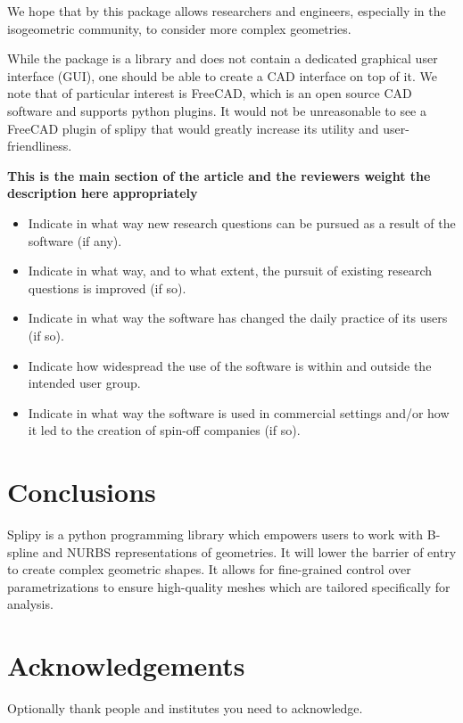 \documentclass[preprint,12pt, a4paper]{elsarticle}
\begin{document}
We hope that by this package allows researchers and engineers, especially in the isogeometric community, to consider more complex geometries.

While the package is a library and does not contain a dedicated graphical user interface (GUI), one should be able to create a CAD interface on top of it.
We note that of particular interest is FreeCAD, which is an open source CAD software and supports python plugins.
It would not be unreasonable to see a FreeCAD plugin of splipy that would greatly increase its utility and user-friendliness.

\textbf{This is the main section of the article and the reviewers weight the description here appropriately}
\begin{itemize}
  \item Indicate in what way new research questions can be pursued as a result of the software (if any).
  \item Indicate in what way, and to what extent, the pursuit of existing research questions is improved (if so).
  \item Indicate in what way the software has changed the daily practice of its users (if so).
  \item Indicate how widespread the use of the software is within and outside the intended user group.
  \item Indicate in what way the software is used in commercial settings and/or how it led to the creation of spin-off companies (if so).
\end{itemize}

\section{Conclusions}
\label{sec:conclusion}

Splipy is a python programming library which empowers users to work with B-spline and NURBS representations of geometries.
It will lower the barrier of entry to create complex geometric shapes.
It allows for fine-grained control over parametrizations to ensure high-quality meshes which are tailored specifically for analysis.

\section*{Acknowledgements}
\label{}

Optionally thank people and institutes you need to acknowledge. 

\end{document}
